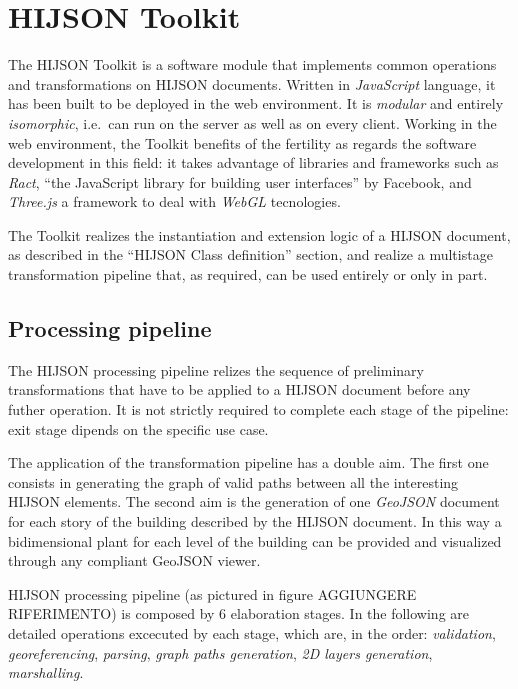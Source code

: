 
\section{HIJSON Toolkit}\label{hijson-toolkit}

The HIJSON Toolkit is a software module that implements common
operations and transformations on HIJSON documents. Written in
\emph{JavaScript} language, it has been built to be deployed in the web
environment. It is \emph{modular} and entirely \emph{isomorphic},
i.e.~can run on the server as well as on every client. Working in the
web environment, the Toolkit benefits of the fertility as regards the
software development in this field: it takes advantage of libraries and
frameworks such as \emph{Ract}, ``the JavaScript library for building
user interfaces'' by Facebook, and \emph{Three.js} a framework to deal
with \emph{WebGL} tecnologies.

The Toolkit realizes the instantiation and extension logic of a HIJSON
document, as described in the ``HIJSON Class definition'' section, and
realize a multistage transformation pipeline that, as required, can be
used entirely or only in part.

\subsection{Processing pipeline}\label{hijson-processing-pipeline}

The HIJSON processing pipeline relizes the sequence of preliminary
transformations that have to be applied to a HIJSON document before any
futher operation. It is not strictly required to complete each stage of
the pipeline: exit stage dipends on the specific use case.

The application of the transformation pipeline has a double aim. The
first one consists in generating the graph of valid paths between all
the interesting HIJSON elements. The second aim is the generation of one
\emph{GeoJSON} document for each story of the building described by the
HIJSON document. In this way a bidimensional plant for each level of the
building can be provided and visualized through any compliant GeoJSON
viewer.

HIJSON processing pipeline (as pictured in figure AGGIUNGERE
RIFERIMENTO) is composed by 6 elaboration stages. In the following are
detailed operations excecuted by each stage, which are, in the order:
\emph{validation}, \emph{georeferencing}, \emph{parsing}, \emph{graph
paths generation}, \emph{2D layers generation}, \emph{marshalling}.

